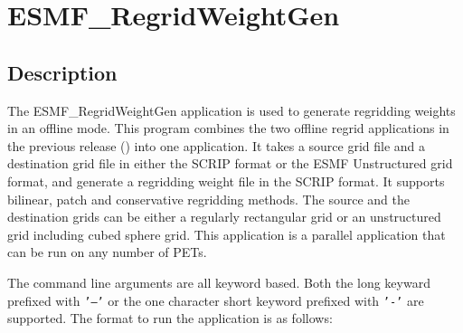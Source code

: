 \section{ESMF\_RegridWeightGen}
\label{sec:ESMF_RegridWeightGen}

\subsection{Description}

The ESMF\_RegridWeightGen application is used to generate regridding weights in an offline mode.
This program combines the two offline regrid applications in the previous release 
(\cite{sec:regrid:offline}) into one application.  It takes a source grid file and a destination grid file
in either the SCRIP format or the ESMF Unstructured grid format, and generate a regridding weight 
file in the SCRIP format.  It supports bilinear, patch and conservative regridding methods.  
The source and the destination grids can be either a regularly rectangular grid or an unstructured grid
including cubed sphere grid.  This application is a parallel application that can be run on any number of PETs.

The command line arguments are all keyword based.  Both the long keyward prefixed with {\tt'--'} or the 
one character short keyword prefixed with {\tt'-'} are supported.  The format to run the application is 
as follows:

